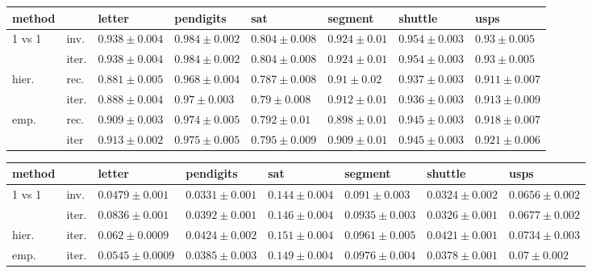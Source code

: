 \begin{table}
{\small
\begin{tabular}{|ll|llllll|}
\hline
 method & & letter & pendigits & sat & segment & shuttle & usps\\
\hline\hline
1 vs 1 & inv. & $0.938 \pm 0.004 $ & $0.984 \pm 0.002 $ & $0.804 \pm 0.008 $ & $0.924 \pm 0.01 $ & $0.954 \pm 0.003 $ & $0.93 \pm 0.005 $ \\
& iter. & $0.938 \pm 0.004 $ & $0.984 \pm 0.002 $ & $0.804 \pm 0.008 $ & $0.924 \pm 0.01 $ & $0.954 \pm 0.003 $ & $0.93 \pm 0.005 $ \\
hier. & rec. & $0.881 \pm 0.005 $ & $0.968 \pm 0.004 $ & $0.787 \pm 0.008 $ & $0.91 \pm 0.02 $ & $0.937 \pm 0.003 $ & $0.911 \pm 0.007 $ \\
 & iter. & $0.888 \pm 0.004 $ & $0.97 \pm 0.003 $ & $0.79 \pm 0.008 $ & $0.912 \pm 0.01 $ & $0.936 \pm 0.003 $ & $0.913 \pm 0.009 $ \\
emp. & rec. & $0.909 \pm 0.003 $ & $0.974 \pm 0.005 $ & $0.792 \pm 0.01 $ & $0.898 \pm 0.01 $ & $0.945 \pm 0.003 $ & $0.918 \pm 0.007 $ \\
 & iter & $0.913 \pm 0.002 $ & $0.975 \pm 0.005 $ & $0.795 \pm 0.009 $ & $0.909 \pm 0.01 $ & $0.945 \pm 0.003 $ & $0.921 \pm 0.006 $ \\
\hline
\end{tabular}
}
\end{table}

\begin{table}
{\small
\begin{tabular}{|ll|llllll|}
\hline
 method & & letter & pendigits & sat & segment & shuttle & usps\\
\hline\hline
1 vs 1 & inv. & $0.0479 \pm 0.001 $ & $0.0331 \pm 0.001 $ & $0.144 \pm 0.004 $ & $0.091 \pm 0.003 $ & $0.0324 \pm 0.002 $ & $0.0656 \pm 0.002 $ \\
 & iter. & $0.0836 \pm 0.001 $ & $0.0392 \pm 0.001 $ & $0.146 \pm 0.004 $ & $0.0935 \pm 0.003 $ & $0.0326 \pm 0.001 $ & $0.0677 \pm 0.002 $ \\
hier. & iter. & $0.062 \pm 0.0009 $ & $0.0424 \pm 0.002 $ & $0.151 \pm 0.004 $ & $0.0961 \pm 0.005 $ & $0.0421 \pm 0.001 $ & $0.0734 \pm 0.003 $ \\
emp. & iter. & $0.0545 \pm 0.0009 $ & $0.0385 \pm 0.003 $ & $0.149 \pm 0.004 $ & $0.0976 \pm 0.004 $ & $0.0378 \pm 0.001 $ & $0.07 \pm 0.002 $ \\
\hline
\end{tabular}
}
\end{table}

